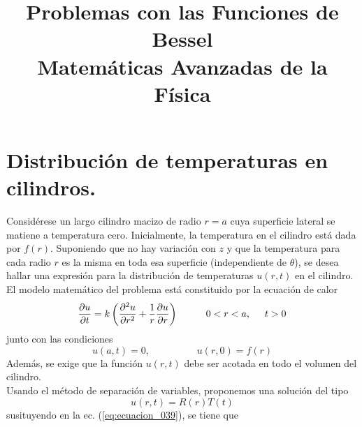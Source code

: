 
\usepackage{mathrsfs}
\usepackage{standalone}
\usepackage{tikz}
\usetikzlibrary{shapes}
\usepackage{bigints}
\newcommand{\saltosin}{\nonumber \\}
\title{Problemas con las Funciones de Bessel \\ {\large Matemáticas Avanzadas de la Física}}
\date{ }

\renewcommand\labelenumii{\theenumi.{\arabic{enumii}}}
\maketitle
\fontsize{14}{14}\selectfont
\section*{Distribución de temperaturas en cilindros.}
Considérese un largo cilindro macizo de radio $r = a$ cuya superficie lateral se matiene a temperatura cero. Inicialmente, la temperatura en el cilindro está dada por $f(r)$. Suponiendo que no hay variación con $z$ y que la temperatura para cada radio $r$ es la misma en toda esa superficie (independiente de $\theta$), se desea hallar una expresión para la distribución de temperaturas $u(r, t)$ en el cilindro.
\\
El modelo matemático del problema está constituido por la ecuación de calor
\begin{equation}
\dfrac{\partial u}{\partial t} = k \left( \dfrac{\partial^{2} u }{\partial r^{2}} + \dfrac{1}{r} \dfrac{\partial u}{\partial r} \right) \hspace{1cm} 0 < r < a, \hspace{0.5cm} t > 0
\label{eq:ecuacion_039}
\end{equation}
junto con las condiciones
\begin{equation}
u(a,t) = 0, \hspace{2cm} u(r,0) =  f(r)
\label{eq:ecuacion_040}
\end{equation}
Además, se exige que la función $u(r,t)$ debe ser acotada en todo el volumen del cilindro.
\\
Usando el método de separación de variables, proponemos una solución del tipo
\begin{equation}
u(r,t) = R(r) T(t)
\label{eq:ecuacion_041}
\end{equation}
susituyendo en la ec. (\ref{eq:ecuacion_039}), se tiene que
